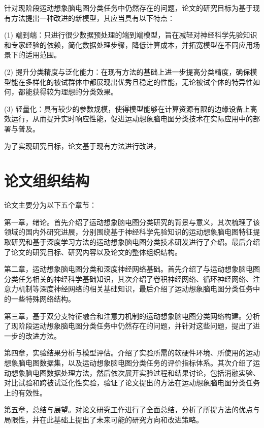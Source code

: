 针对现阶段运动想象脑电图分类任务中仍然存在的问题，论文的研究目标为基于现有方法提出一种改进的新模型，其应当具有以下特点：

(1) 端到端：只进行很少数据预处理的端到端模型，旨在减轻对神经科学先验知识和专家经验的依赖，简化数据处理步骤，降低计算成本，并拓宽模型在不同应用场景下的适用范围。

(2) 提升分类精度与泛化能力：在现有方法的基础上进一步提高分类精度，确保模型能在多样化的被试群体中都展现出优秀且稳定的性能，无论被试个体的特异性如何，都能获得较为理想的分类效果。

(3) 轻量化：具有较少的参数规模，使得模型能够在计算资源有限的边缘设备上高效运行，从而提升实时响应性能，促进运动想象脑电图分类技术在实际应用中的部署与普及。

为了实现研究目标，论文基于现有方法进行改进，

\section{论文组织结构}

论文主要分为以下五个章节：

第一章，绪论。首先介绍了运动想象脑电图分类研究的背景与意义，其次梳理了该领域的国内外研究进展，分别围绕基于神经科学先验知识的运动想象脑电图特征提取研究和基于深度学习方法的运动想象脑电图分类技术研发进行了介绍。最后介绍了论文的研究目标、研究内容以及论文的整体组织结构。

第二章，运动想象脑电图分类和深度神经网络基础。首先介绍了与运动想象脑电图分类任务相关的神经科学基础知识，其次介绍了卷积神经网络、循环神经网络、注意力机制等深度神经网络的相关基础知识，最后介绍了运动想象脑电图分类任务中的一些特殊网络结构。

第三章，基于双分支特征融合和注意力机制的运动想象脑电图分类网络构建。分析了现阶段运动想象脑电图分类任务中仍然存在的问题，并针对这些问题，提出了进一步的改进方法。

第四章，实验结果分析与模型评估。介绍了实验所需的软硬件环境、所使用的运动想象脑电图数据集，以及运动想象脑电图分类任务的评价指标体系。其次介绍了运动想象脑电图数据处理方法，然后依次展开实验过程和结果讨论，包括消融实验、对比试验和跨被试泛化性实验，验证了论文提出的方法在运动想象脑电图分类任务上的有效性。

第五章，总结与展望。对论文研究工作进行了全面总结，分析了所提方法的优点与局限性，并在此基础上提出了未来可能的研究方向和改进策略。